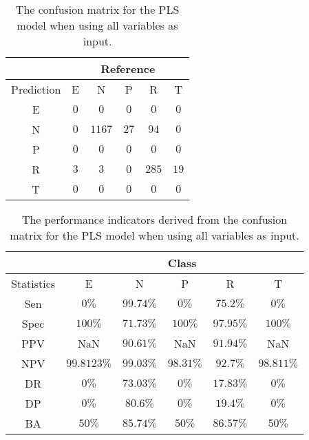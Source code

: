 \begin{table}[!ht]
	\centering
	\begin{tabular}{|c|c|c|c|c|c|}
		\hline
		 & \multicolumn{5}{|c|}{Reference} \\ \hline
		 Prediction & E & N & P & R & T \\ \hline
		 E & $0$ & $0$ & $0$ & $0$ & $0$ \\ \hline
		 N & $0$ & $1167$ & $27$ & $94$ & $0$ \\ \hline
		 P & $0$ & $0$ & $0$ & $0$ & $0$ \\ \hline
		 R & $3$ & $3$ & $0$ & $285$ & $19$ \\ \hline
		 T & $0$ & $0$ & $0$ & $0$ & $0$ \\ \hline
	\end{tabular}
	\caption{The confusion matrix for the PLS model when using all variables as input.}
	\label{tab:cm:all:pls}
\end{table}

\begin{table}[!ht]
	\centering
	\begin{tabular}{|c|c|c|c|c|c|}
		\hline
		 & \multicolumn{5}{c|}{Class} \\ \hline
		Statistics & E & N & P & R & T \\ \hline
		Sen & $0\%$ & $99.74\%$ & $0\%$ & $75.2\%$ & $0\%$ \\ \hline
		Spec & $100\%$ & $71.73\%$ & $100\%$ & $97.95\%$ & $100\%$ \\ \hline
		PPV & NaN & $90.61\%$ & NaN & $91.94\%$ & NaN \\ \hline
		NPV & $99.8123\%$ & $99.03\%$ & $98.31\%$ & $92.7\%$ & $98.811\%$ \\ \hline
		DR & $0\%$ & $73.03\%$ & $0\%$ & $17.83\%$ & $0\%$ \\ \hline
		DP & $0\%$ & $80.6\%$ & $0\%$ & $19.4\%$ & $0\%$ \\ \hline
		BA & $50\%$ & $85.74\%$ & $50\%$ & $86.57\%$ & $50\%$ \\ \hline
	\end{tabular}
	\caption{The performance indicators derived from the confusion matrix for the PLS model when using all variables as input.}
	\label{tab:cs:reverse:all:pls}
\end{table}

